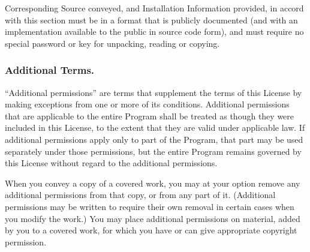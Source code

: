 \documentclass[10pt,english]{article}
\begin{document}
Corresponding Source conveyed, and Installation Information provided,
in accord with this section must be in a format that is publicly documented
(and with an implementation available to the public in source code
form), and must require no special password or key for unpacking,
reading or copying.


\subsubsection{Additional Terms.}

\textquotedblleft{}Additional permissions\textquotedblright{} are
terms that supplement the terms of this License by making exceptions
from one or more of its conditions. Additional permissions that are
applicable to the entire Program shall be treated as though they were
included in this License, to the extent that they are valid under
applicable law. If additional permissions apply only to part of the
Program, that part may be used separately under those permissions,
but the entire Program remains governed by this License without regard
to the additional permissions.

When you convey a copy of a covered work, you may at your option remove
any additional permissions from that copy, or from any part of it.
(Additional permissions may be written to require their own removal
in certain cases when you modify the work.) You may place additional
permissions on material, added by you to a covered work, for which
you have or can give appropriate copyright permission.
\end{document}
